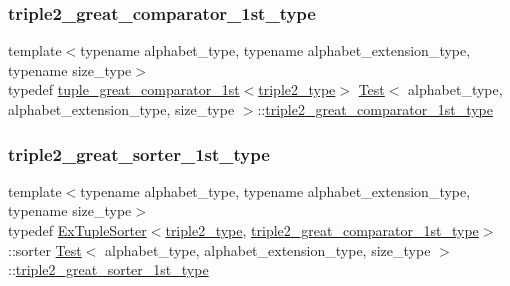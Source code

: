 \mbox{\label{class_test_aeafbf94ce50f60c6c463e2e57a4d43a5}} 
\subsubsection{\texorpdfstring{triple2\+\_\+great\+\_\+comparator\+\_\+1st\+\_\+type}{triple2\_great\_comparator\_1st\_type}}
{\footnotesize\ttfamily template$<$typename alphabet\+\_\+type, typename alphabet\+\_\+extension\+\_\+type, typename size\+\_\+type$>$ \\
typedef \hyperlink{structtuple__great__comparator__1st}{tuple\+\_\+great\+\_\+comparator\+\_\+1st}$<$\hyperlink{class_test_ae1d42342f4ec472a724f55af01c3c5ab}{triple2\+\_\+type}$>$ \hyperlink{class_test}{Test}$<$ alphabet\+\_\+type, alphabet\+\_\+extension\+\_\+type, size\+\_\+type $>$\+::\hyperlink{class_test_aeafbf94ce50f60c6c463e2e57a4d43a5}{triple2\+\_\+great\+\_\+comparator\+\_\+1st\+\_\+type}\hspace{0.3cm}{\ttfamily [private]}}

\mbox{\label{class_test_ad87ac75730f80ef0824f0c56ec7db12d}} 
\subsubsection{\texorpdfstring{triple2\+\_\+great\+\_\+sorter\+\_\+1st\+\_\+type}{triple2\_great\_sorter\_1st\_type}}
{\footnotesize\ttfamily template$<$typename alphabet\+\_\+type, typename alphabet\+\_\+extension\+\_\+type, typename size\+\_\+type$>$ \\
typedef \hyperlink{struct_ex_tuple_sorter}{Ex\+Tuple\+Sorter}$<$\hyperlink{class_test_ae1d42342f4ec472a724f55af01c3c5ab}{triple2\+\_\+type}, \hyperlink{class_test_aeafbf94ce50f60c6c463e2e57a4d43a5}{triple2\+\_\+great\+\_\+comparator\+\_\+1st\+\_\+type}$>$\+::sorter \hyperlink{class_test}{Test}$<$ alphabet\+\_\+type, alphabet\+\_\+extension\+\_\+type, size\+\_\+type $>$\+::\hyperlink{class_test_ad87ac75730f80ef0824f0c56ec7db12d}{triple2\+\_\+great\+\_\+sorter\+\_\+1st\+\_\+type}\hspace{0.3cm}{\ttfamily [private]}}

